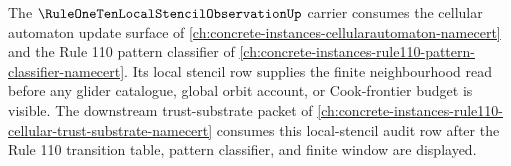 The $\RuleOneTenLocalStencilObservationUp$ carrier consumes the cellular automaton update surface of \autoref{ch:concrete-instances-cellularautomaton-namecert} and the Rule 110 pattern classifier of \autoref{ch:concrete-instances-rule110-pattern-classifier-namecert}. Its local stencil row supplies the finite neighbourhood read before any glider catalogue, global orbit account, or Cook-frontier budget is visible. The downstream trust-substrate packet of \autoref{ch:concrete-instances-rule110-cellular-trust-substrate-namecert} consumes this local-stencil audit row after the Rule 110 transition table, pattern classifier, and finite window are displayed.
